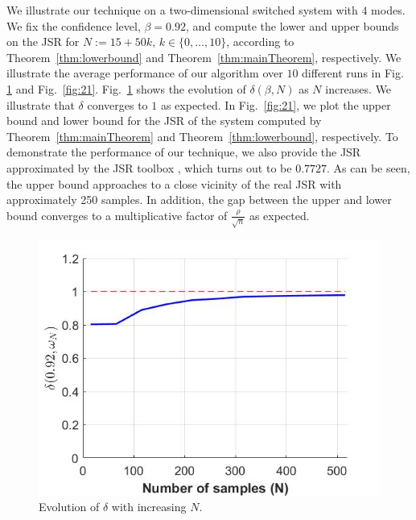 We illustrate our technique on a two-dimensional switched system with $4$ modes. We fix the confidence level, \mbox{$\beta = 0.92$}, and compute the lower and upper bounds on the JSR for $N:=15+50k,\, k \in\{0, \ldots, 10\}$, according to Theorem~\ref{thm:lowerbound} and Theorem~\ref{thm:mainTheorem}, respectively. We illustrate the average performance of our algorithm over $10$ different runs in Fig.~ \ref{fig:11} and Fig.~\ref{fig:21}. Fig.~\ref{fig:11} shows the evolution of $\delta(\beta, N)$ as $N$ increases. We illustrate that $\delta$ converges to $1$ as expected. In Fig.~\ref{fig:21}, we plot the upper bound and lower bound for the JSR of the system computed by Theorem~\ref{thm:mainTheorem} and Theorem~\ref{thm:lowerbound}, respectively. To demonstrate the performance of our technique, we also provide the JSR approximated by the JSR toolbox \cite{jsrtoolbox}, which turns out to be $0.7727$. As can be seen, the upper bound approaches to a close vicinity of the real JSR with approximately 250 samples. In addition, the gap between the upper and lower bound converges to a multiplicative factor of $\frac{\rho}{\sqrt{n}}$ as expected.

\begin{figure}
\begin{center}
\includegraphics[trim = 5mm 5mm 5mm 5mm, scale=0.35]{delta1.jpg}

\caption{Evolution of $\delta$ with increasing $N$.}
\label{fig:11}
\end{center}
\end{figure}

